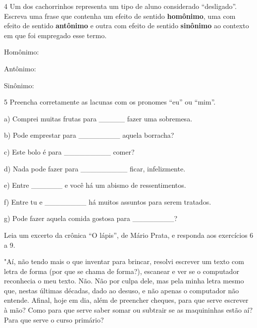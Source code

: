 {

\num{4} Um dos cachorrinhos representa um tipo de aluno considerado
``desligado''. Escreva uma frase que contenha um efeito de sentido
\textbf{homônimo}, uma com efeito de sentido \textbf{antônimo} e outra
com efeito de sentido \textbf{sinônimo} ao contexto em que foi empregado
esse termo.

Homônimo:

Antônimo:

Sinônimo:


\num{5} Preencha corretamente as lacunas com os pronomes ``eu'' ou
``mim''.

a) Comprei muitas frutas para \_\_\_\_\_ fazer uma sobremesa.

b) Pode emprestar para \_\_\_\_\_\_\_\_ aquela borracha?

c) Este bolo é para \_\_\_\_\_\_\_\_\_ comer?

d) Nada pode fazer para \_\_\_\_\_\_\_\_\_ ficar, infelizmente.

e) Entre \_\_\_\_\_\_ e você há um abismo de ressentimentos.

f) Entre tu e \_\_\_\_\_\_\_\_ há muitos assuntos para serem tratados.

g) Pode fazer aquela comida gostosa para \_\_\_\_\_\_\_\_?


Leia um excerto da crônica ``O lápis'', de Mário Prata, e responda aos
exercícios 6 a 9.

"Aí, não tendo mais o que inventar para brincar, resolvi escrever um
texto com letra de forma (por que se chama de forma?), escanear e ver se
o computador reconhecia o meu texto. Não. Não por culpa dele, mas pela
minha letra mesmo que, nestas últimas décadas, dado ao desuso, e não
apenas o computador não entende. Afinal, hoje em dia, além de preencher
cheques, para que serve escrever à mão? Como para que serve saber somar
ou subtrair se as maquininhas estão aí? Para que serve o curso primário?

}
